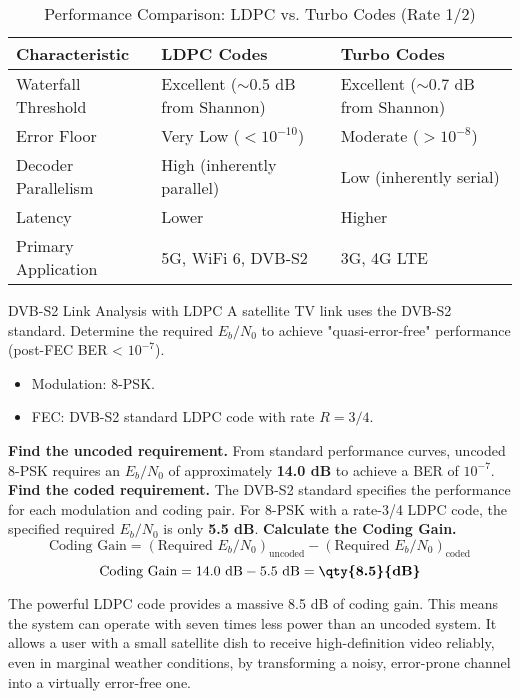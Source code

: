 \begin{table}[H]
    \centering
    \caption{Performance Comparison: LDPC vs. Turbo Codes (Rate 1/2)}
    \label{tab:ldpc-vs-turbo}
    \begin{tabular}{@{}lll@{}}
        \toprule
        \tableheaderfont Characteristic & \tableheaderfont LDPC Codes & \tableheaderfont Turbo Codes \\
        \midrule
        Waterfall Threshold & Excellent ($\sim$0.5 dB from Shannon) & Excellent ($\sim$0.7 dB from Shannon) \\
        Error Floor & Very Low ($<10^{-10}$) & Moderate ($>10^{-8}$) \\
        Decoder Parallelism & High (inherently parallel) & Low (inherently serial) \\
        Latency & Lower & Higher \\
        Primary Application & 5G, WiFi 6, DVB-S2 & 3G, 4G LTE \\
        \bottomrule
    \end{tabular}
\end{table}


\begin{workedexample}{DVB-S2 Link Analysis with LDPC}
     A satellite TV link uses the DVB-S2 standard. Determine the required $E_b/N_0$ to achieve "quasi-error-free" performance (post-FEC BER < $10^{-7}$).
    \begin{itemize}
        \item Modulation: 8-PSK.
        \item FEC: DVB-S2 standard LDPC code with rate $R=3/4$.
    \end{itemize}
    \begin{derivationsteps}
        \step \textbf{Find the uncoded requirement.} From standard performance curves, uncoded 8-PSK requires an $E_b/N_0$ of approximately \textbf{14.0 dB} to achieve a BER of $10^{-7}$.
        \step \textbf{Find the coded requirement.} The DVB-S2 standard specifies the performance for each modulation and coding pair. For 8-PSK with a rate-3/4 LDPC code, the specified required $E_b/N_0$ is only \textbf{5.5 dB}.
        \step \textbf{Calculate the Coding Gain.}
        \[ \text{Coding Gain} = (\text{Required } E_b/N_0)_{\text{uncoded}} - (\text{Required } E_b/N_0)_{\text{coded}} \]
        \[ \text{Coding Gain} = 14.0 \text{ dB} - 5.5 \text{ dB} = \textbf{\qty{8.5}{dB}} \]
    \end{derivationsteps}
     The powerful LDPC code provides a massive 8.5 dB of coding gain. This means the system can operate with seven times less power than an uncoded system. It allows a user with a small satellite dish to receive high-definition video reliably, even in marginal weather conditions, by transforming a noisy, error-prone channel into a virtually error-free one.
\end{workedexample}


